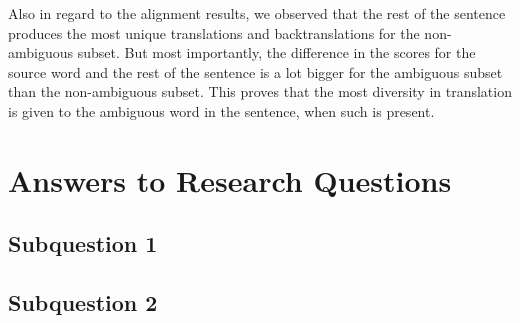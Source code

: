 Also in regard to the alignment results, we observed that the rest of the sentence produces the most unique translations and backtranslations for the non-ambiguous subset. But most importantly, the difference in the scores for the source word and the rest of the sentence is a lot bigger for the ambiguous subset than the non-ambiguous subset. This proves that the most diversity in translation is given to the ambiguous word in the sentence, when such is present.









\section{Answers to Research Questions}
\label{sec:Discussion:Answers}

\subsection{Subquestion 1} %
\label{sec:Discussion:Answers:1}

\subsection{Subquestion 2} %
\label{sec:Discussion:Answers:2}

